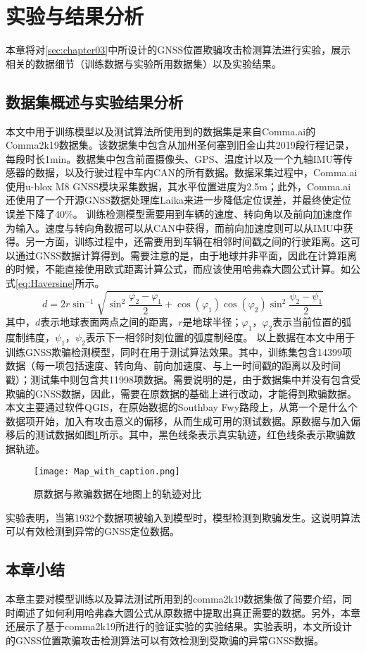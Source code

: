 \section{实验与结果分析}
本章将对\ref{sec:chapter03}中所设计的GNSS位置欺骗攻击检测算法进行实验，展示相关的数据细节（训练数据与实验所用数据集）以及实验结果。
\subsection{数据集概述与实验结果分析}
本文中用于训练模型以及测试算法所使用到的数据集是来自Comma.ai的Comma2k19数据集\cite{commaai}。该数据集中包含从加州圣何塞到旧金山共2019段行程记录，每段时长1min。数据集中包含前置摄像头、GPS、温度计以及一个九轴IMU等传感器的数据，以及行驶过程中车内CAN的所有数据。数据采集过程中，Comma.ai使用u-blox M8 GNSS模块采集数据，其水平位置进度为2.5m；此外，Comma.ai还使用了一个开源GNSS数据处理库Laika来进一步降低定位误差，并最终使定位误差下降了40\%。
训练检测模型需要用到车辆的速度、转向角以及前向加速度作为输入。速度与转向角数据可以从CAN中获得，而前向加速度则可以从IMU中获得。另一方面，训练过程中，还需要用到车辆在相邻时间戳之间的行驶距离。这可以通过GNSS数据计算得到。需要注意的是，由于地球并非平面，因此在计算距离的时候，不能直接使用欧式距离计算公式，而应该使用哈弗森大圆公式计算。如公式\ref{eq:Haversine}所示。
\begin{equation}
    d=2r\sin^{-1}\sqrt{\sin^2\frac{\varphi_2-\varphi_1}{2}+\cos(\varphi_1)\cos(\varphi_2)\sin^2\frac{\psi_2-\psi_1}{2}}
    \label{eq:Haversine}
\end{equation}
其中，$d$表示地球表面两点之间的距离，$r$是地球半径；$\varphi_1$，$\varphi_2$表示当前位置的弧度制纬度，$\psi_1$，$\psi_2$表示下一相邻时刻位置的弧度制经度。
以上数据在本文中用于训练GNSS欺骗检测模型，同时在用于测试算法效果。其中，训练集包含14399项数据（每一项包括速度、转向角、前向加速度、与上一时间戳的距离以及时间戳）；测试集中则包含共11998项数据。需要说明的是，由于数据集中并没有包含受欺骗的GNSS数据，因此，需要在原数据的基础上进行改动，才能得到欺骗数据。本文主要通过软件QGIS，在原始数据的Southbay Fwy路段上，从第一个是什么个数据项开始，加入有攻击意义的偏移，从而生成可用的测试数据。原数据与加入偏移后的测试数据如图\ref{fig:map}所示。其中，黑色线条表示真实轨迹，红色线条表示欺骗数据轨迹。
\begin{figure}
    \begin{center}
        \texttt{[image: Map\_with\_caption.png]}
    \end{center}
    \caption{原数据与欺骗数据在地图上的轨迹对比}
    \label{fig:map}
\end{figure}
实验表明，当第1932个数据项被输入到模型时，模型检测到欺骗发生。这说明算法可以有效检测到异常的GNSS定位数据。
\subsection{本章小结}
本章主要对模型训练以及算法测试所用到的comma2k19数据集做了简要介绍，同时阐述了如何利用哈弗森大圆公式从原数据中提取出真正需要的数据。另外，本章还展示了基于comma2k19所进行的验证实验的实验结果。实验表明，本文所设计的GNSS位置欺骗攻击检测算法可以有效检测到受欺骗的异常GNSS数据。
